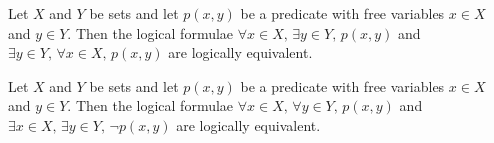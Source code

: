 \begin{chapex} %
Let $X$ and $Y$ be sets and let $p(x,y)$ be a predicate with free variables $x \in X$ and $y \in Y$. Then the logical formulae $\forall x \in X,\, \exists y \in Y,\, p(x,y)$ and $\exists y \in Y,\, \forall x \in X,\, p(x,y)$ are logically equivalent.
\end{chapex}

\begin{chapex} %
\label{cqLogicASNEnd}
Let $X$ and $Y$ be sets and let $p(x,y)$ be a predicate with free variables $x \in X$ and $y \in Y$. Then the logical formulae $\forall x \in X,\, \forall y \in Y,\, p(x,y)$ and $\exists x \in X,\, \exists y \in Y,\, \neg p(x,y)$ are logically equivalent.
\end{chapex}